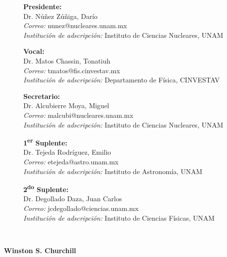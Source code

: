 \documentclass[11pt,twoside,openright,spanish]{report}
\numberwithin{equation}{chapter}
\numberwithin{figure}{chapter}
\numberwithin{table}{chapter}
\newenvironment{changemargin}[3]{
	\begin{list}{}{
			\setlength{\topsep}{#3}
			\setlength{\leftmargin}{#1}
			\setlength{\rightmargin}{#2}
			\setlength{\listparindent}{\parindent}
			\setlength{\itemindent}{\parindent}
			\setlength{\parsep}{\parskip}
		}
		\item[]}{\end{list}}
\begin{document}
\begin{changemargin}{1cm}{0cm}{1cm}
\begin{description}
			\item[]\textbf{Presidente:}\\
			Dr. Núñez Zúñiga, Darío\\
			\textit{Correo:} nunez@nucleares.unam.mx\\
			\textit{Institución de adscripción:} Instituto de Ciencias Nucleares, UNAM
			\item[]\textbf{Vocal:}\\
			Dr. Matos Chassin, Tonatiuh\\
			\textit{Correo:} tmatos@fis.cinvestav.mx \\
			\textit{Institución de adscripción:} Departamento de Física, CINVESTAV
			\item[]\textbf{Secretario:}\\
			Dr. Alcubierre Moya, Miguel\\
			\textit{Correo:} malcubi@nucleares.unam.mx\\
			\textit{Institución de adscripción:} Instituto de Ciencias Nucleares, UNAM
			\item[]\textbf{1\textsuperscript{er} Suplente:}\\
			Dr. Tejeda Rodríguez, Emilio\\
			\textit{Correo:} etejeda@astro.unam.mx\\
			\textit{Institución de adscripción:} Instituto de Astronomía, UNAM
			\item[]\textbf{2\textsuperscript{do} Suplente:}\\
			Dr. Degollado Daza, Juan Carlos\\
			\textit{Correo:} jcdegollado@ciencias.unam.mx\\
			\textit{Institución de adscripción:} Instituto de Ciencias Físicas, UNAM
		\end{description}
		\thispagestyle{empty}
	\end{changemargin}
	
	
	\ChTitleVar{\raggedright\Large\sffamily\bfseries}
	
	\evensidemargin 0in 
	\oddsidemargin 0.6in
	
	\newpage{\ } 
	\thispagestyle{empty}
	
	\begin{dedication}
		{\Large{}}\\
		\begin{comment}
		{\footnotesize{\dots black holes ain't as black as they are painted. They are not the eternal prisons they were once though\dots things can get out of a black hole both on the outside and possibly to another universe. So if you feel you are in a black hole, don’t give up, there’s a way out.}}\\
		\end{comment}
		\vspace{0.5cm}
		{\normalsize{\bfseries{Winston S. Churchill}}}
	\end{dedication}
	
\end{document}
